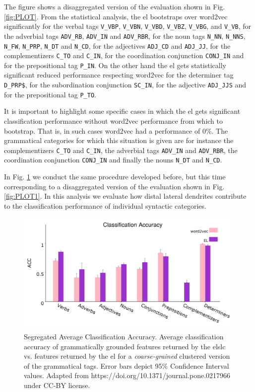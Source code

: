 {The figure shows a disaggregated version of the evaluation shown in Fig. \ref{fig:PLOT}.
From the statistical analysis, the \gls{el} bootstraps over word2vec significantly for the verbal tags
\texttt{V\_VBP}, \texttt{V\_VBN}, \texttt{V\_VBD}, \texttt{V\_VBZ}, \texttt{V\_VBG}, and \texttt{V\_VB},
for the adverbial tags \texttt{ADV\_RB}, \texttt{ADV\_IN} and \texttt{ADV\_RBR},
for the noun tags \texttt{N\_NN}, \texttt{N\_NNS}, \texttt{N\_FW}, \texttt{N\_PRP}, \texttt{N\_DT} and \texttt{N\_CD},
for the adjectives \texttt{ADJ\_CD} and \texttt{ADJ\_JJ},
for the complementizers \texttt{C\_TO}  and  \texttt{C\_IN}, for the coordination conjunction  \texttt{CONJ\_IN} and for the prepositional tag \texttt{P\_IN}.
On the other hand the \gls{el} gets statistically significant reduced performance respecting word2vec for the determiner tag
\texttt{D\_PRP\$}, for the subordination conjunction \texttt{SC\_IN}, for the adjective \texttt{ADJ\_JJS} and for the prepositional tag \texttt{P\_TO}.

It is important to highlight some specific cases in which the \gls{el} gets significant classification performance without word2vec performance from which to bootstrap. That is, in such cases word2vec had a performance of 0\%. The grammatical categories for which this situation is given are for instance the complementizers \texttt{C\_TO} and  \texttt{C\_IN}, the adverbial tags \texttt{ADV\_IN} and \texttt{ADV\_RBR}, the coordination conjunction  \texttt{CONJ\_IN} and finally the nouns \texttt{N\_DT} and \texttt{N\_CD}.


In Fig. \ref{fig:PLOT3} we conduct the same procedure developed before, but this time corresponding to a disaggregated version of the evaluation shown in Fig. \ref{fig:PLOT1}. In this analysis we evaluate how distal lateral dendrites contribute to the classification performance of individual syntactic categories.

\begin{figure}[ht!]
    \centering
    \includegraphics[width=0.99\textwidth]{PLOT3.png}
    \caption{Segregated Average Classification Accuracy. Average classification accuracy of grammatically grounded features returned by the \gls{elslc} vs. features returned by the \gls{el} for a \emph{coarse-grained} clustered version of the grammatical tags. Error bars depict 95\% Confidence Interval values. Adapted from https://doi.org/10.1371/journal.pone.0217966 under CC-BY license.}
    \label{fig:PLOT3}
\end{figure}

}

